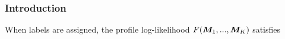 \documentclass{article}
\newtheorem{remark}{Remark}
\DeclareMathOperator*{\mcr}{MCR}
\DeclareMathOperator*{\cer}{CER}
\begin{document}
\begin{appendices}
%
%

\subsubsection{Introduction}


When labels are assigned, the profile log-likelihood $F(\boldsymbol{M}_1,...,\boldsymbol{M}_K)$ satisfies


\end{appendices}
\end{document}
